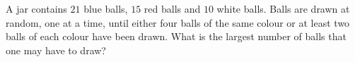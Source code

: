A jar contains $21$ blue balls, $15$ red balls and $10$ white balls. Balls are drawn at random, one at a time, until either four balls of the same colour or at least two balls of each colour have been drawn. What is the largest number of balls that one may have to draw?
